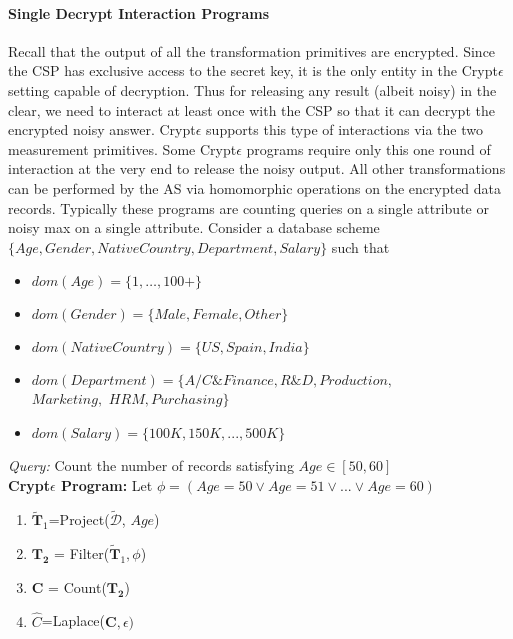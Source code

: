 \paragraph{\textbf{Single Decrypt Interaction Programs}}
Recall that the output of all the transformation primitives are encrypted.  Since  the \textsf{CSP} has exclusive access to the secret key, it is the only entity in the Crypt$\epsilon$ setting capable of decryption. Thus for releasing any result (albeit noisy) in the clear, we need to interact at least once with the \textsf{CSP} so that it can decrypt the encrypted noisy answer. Crypt$\epsilon$ supports this type of interactions via the two measurement primitives. Some Crypt$\epsilon$ programs require only this one round of interaction at the very end to release the noisy output. All other transformations can be performed by the \textsf{AS} via homomorphic operations on the encrypted data records. Typically these programs are counting queries on a single attribute or noisy max on a single attribute. 
Consider a database scheme $\{Age, Gender, NativeCountry, Department, Salary\}$ such that \begin{itemize}\item $dom(Age)=\{1,\ldots,100+\}$  \item $dom(Gender)=\{Male, Female, Other\}$\item $dom(NativeCountry)=\{US,Spain,India\}$ \item $dom(Department)=\{A/C \& Finance, R\&D, Production,$\\$ Marketing,$ $HRM, Purchasing \}$ \item $dom(Salary)=\{100K,150K,...,500K\}$ \end{itemize} 
\begin{exmp}
\textit{Query: } Count the number of records satisfying $Age \in [50,60]$\\
\textbf{Crypt$\epsilon$ Program:}
Let $\phi=(Age=50 \vee Age=51 \vee ... \vee Age=60)$ \end{exmp}
\begin{enumerate} \item $\mathbf{\tilde{T}}_1$=\textsf{Project}($\boldsymbol{\tilde{\mathcal{D}}}$, $Age$)  \item  $\mathbf{T_2}$ = \textsf{Filter}($\mathbf{\tilde{T}}_1,\phi$)\item $\mathbf{C}$ = \textsf{Count}($\mathbf{T_2}$) \item $\hat{C}$=\textsf{Laplace}($\mathbf{C},\epsilon)$\end{enumerate}

